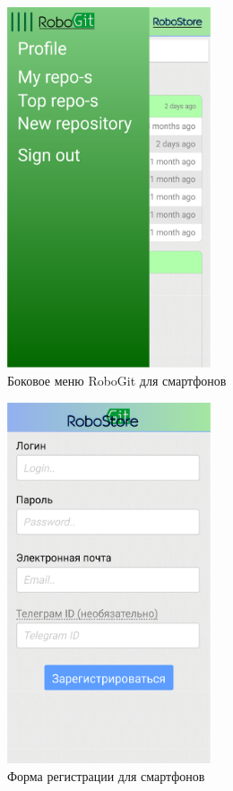 \documentclass[12pt, a4paper]{article}
\begin{document}
\begin{figure}[H]
  \centering
  \includegraphics[width=6cm]{png/git_menu_smart.png}
  \caption{Боковое меню RoboGit для смартфонов}
\end{figure}

\begin{figure}[H]
  \centering
  \includegraphics[width=6cm]{png/sign_smart.png}
  \caption{Форма регистрации для смартфонов}
\end{figure}
\end{document}
